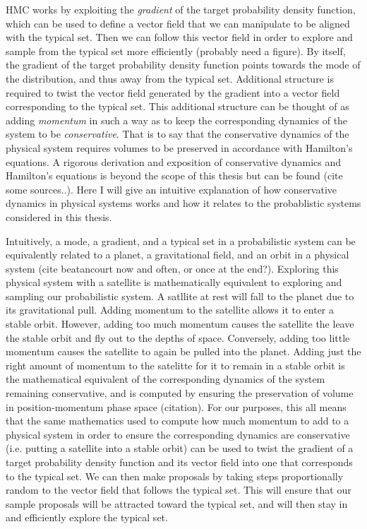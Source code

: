 HMC works by exploiting the \textit{gradient} of the target probability density function, which can be used to define a vector field that we can manipulate to be aligned with the typical set. Then we can follow this vector field in order to explore and sample from the typical set more efficiently (probably need a figure). By itself, the gradient of the target probability density function points towards the mode of the distribution, and thus away from the typical set. Additional structure is required to twist the vector field generated by the gradient into a vector field corresponding to the typical set. This additional structure can be thought of as adding \textit{momentum} in such a way as to keep the corresponding dynamics of the system to be \textit{conservative}. That is to say that the conservative dynamics of the physical system requires volumes to be preserved in accordance with Hamilton's equations. A rigorous derivation and exposition of conservative dynamics and Hamilton's equations is beyond the scope of this thesis but can be found (cite some sources..). Here I will give an intuitive explanation of how conservative dynamics in physical systems works and how it relates to the probablistic systems considered in this thesis.

Intuitively, a mode, a gradient, and a typical set in a probabilistic system can be equivalently related to a planet, a gravitational field, and an orbit in a physical system (cite beatancourt now and often, or once at the end?). Exploring this physical system with a satellite is mathematically equivalent to exploring and sampling our probabilistic system. A satllite at rest will fall to the planet due to its gravitational pull. Adding momentum to the satellite allows it to enter a stable orbit. However, adding too much momentum causes the satellite the leave the stable orbit and fly out to the depths of space. Conversely, adding too little momentum causes the satellite to again be pulled into the planet. Adding just the right amount of momentum to the satelitte for it to remain in a stable orbit is the mathematical equivalent of the corresponding dynamics of the system remaining conservative, and is computed by ensuring the preservation of volume in position-momentum phase space (citation). For our purposes, this all means that the same mathematics used to compute how much momentum to add to a physical system in order to ensure the corresponding dynamics are conservative (i.e. putting a satellite into a stable orbit) can be used to twist the gradient of a target probability density function and its vector field into one that corresponds to the typical set. We can then make proposals by taking steps proportionally random to the vector field that follows the typical set. This will ensure that our sample proposals will be attracted toward the typical set, and will then stay in and efficiently explore the typical set.
